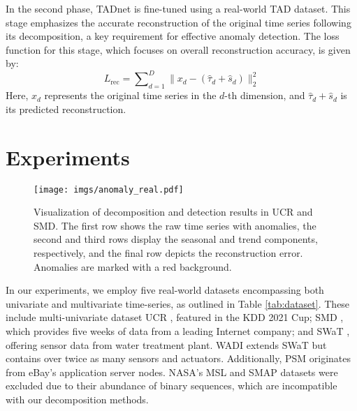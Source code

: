 \documentclass{article}
\begin{document}
In the second phase, TADnet is fine-tuned using a real-world TAD dataset. This stage emphasizes the accurate reconstruction of the original time series following its decomposition, a key requirement for effective anomaly detection. The loss function for this stage, which focuses on overall reconstruction accuracy, is given by:
\begin{equation}
L_{\text{rec}} = \sum\nolimits_{d=1}^{D} \lVert x_d- (\hat\tau_d + \hat s_d)\rVert_2^2
\end{equation}
Here, \( x_d \) represents the original time series in the \( d \)-th dimension, and \( \hat{\tau}_d + \hat{s}_d \) is its predicted reconstruction.



\section{Experiments}

\begin{figure*}[t]
\centering
\texttt{[image: imgs/anomaly\_real.pdf]}
\vspace{-10pt}
\caption{Visualization of decomposition and detection results in UCR and SMD. The first row shows the raw time series with anomalies, the second and third rows display the seasonal and trend components, respectively, and the final row depicts the reconstruction error. Anomalies are marked with a red background.}
\label{fig:real_results}
\end{figure*}

In our experiments, we employ five real-world datasets encompassing both univariate and multivariate time-series, as outlined in Table \ref{tab:dataset}. 
These include multi-univariate dataset UCR \cite{keogh2021multi}, featured in the KDD 2021 Cup; SMD \cite{su2019robust}, which provides five weeks of data from a leading Internet company; and SWaT \cite{mathur2016swat}, offering sensor data from water treatment plant. WADI extends SWaT but contains over twice as many sensors and actuators. Additionally, PSM \cite{abdulaal2021practical} originates from eBay's application server nodes.
NASA's MSL and SMAP \cite{hundman2018detecting} datasets were excluded due to their abundance of binary sequences, which are incompatible with our decomposition methods.
\end{document}
